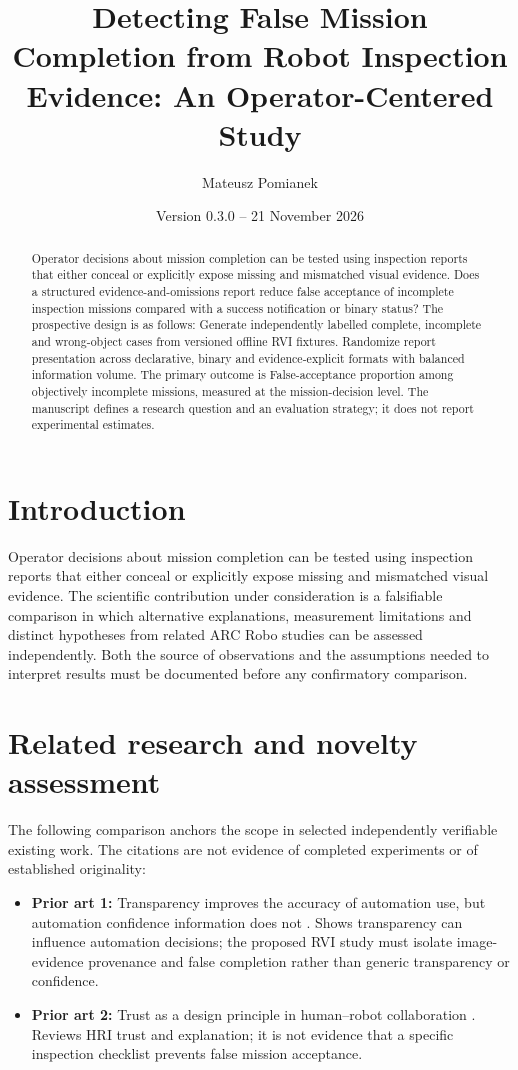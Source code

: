 \documentclass[11pt,a4paper]{article}
\title{Detecting False Mission Completion from Robot Inspection Evidence: An Operator-Centered Study}
\author{Mateusz Pomianek}
\date{Version 0.3.0 -- 21 November 2026}
\begin{document}
\maketitle

\begin{abstract}
Operator decisions about mission completion can be tested using inspection reports that either conceal or explicitly expose missing and mismatched visual evidence. Does a structured evidence-and-omissions report reduce false acceptance of incomplete inspection missions compared with a success notification or binary status? The prospective design is as follows: Generate independently labelled complete, incomplete and wrong-object cases from versioned offline RVI fixtures. Randomize report presentation across declarative, binary and evidence-explicit formats with balanced information volume. The primary outcome is False-acceptance proportion among objectively incomplete missions, measured at the mission-decision level. The manuscript defines a research question and an evaluation strategy; it does not report experimental estimates.
\end{abstract}

\section{Introduction}
Operator decisions about mission completion can be tested using inspection reports that either conceal or explicitly expose missing and mismatched visual evidence. The scientific contribution under consideration is a falsifiable comparison in which alternative explanations, measurement limitations and distinct hypotheses from related ARC Robo studies can be assessed independently. Both the source of observations and the assumptions needed to interpret results must be documented before any confirmatory comparison.

\section{Related research and novelty assessment}
The following comparison anchors the scope in selected independently verifiable existing work. The citations are not evidence of completed experiments or of established originality:
\begin{itemize}
\item \textbf{Prior art 1:} Transparency improves the accuracy of automation use, but automation confidence information does not \cite{source1}. Shows transparency can influence automation decisions; the proposed RVI study must isolate image-evidence provenance and false completion rather than generic transparency or confidence.
\item \textbf{Prior art 2:} Trust as a design principle in human--robot collaboration \cite{source2}. Reviews HRI trust and explanation; it is not evidence that a specific inspection checklist prevents false mission acceptance.
\end{itemize}
\end{document}
